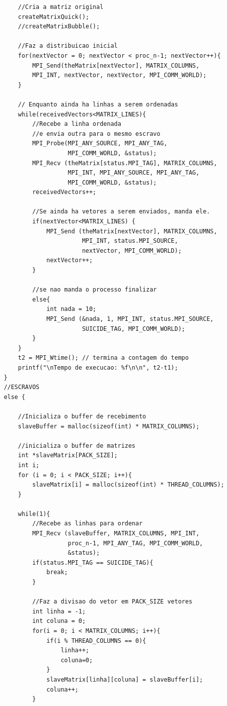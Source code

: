 \documentclass[12pt]{article}
\begin{document}
\begin{lstlisting}
        //Cria a matriz original
        createMatrixQuick();
        //createMatrixBubble();

        //Faz a distribuicao inicial
        for(nextVector = 0; nextVector < proc_n-1; nextVector++){
            MPI_Send(theMatrix[nextVector], MATRIX_COLUMNS,
            MPI_INT, nextVector, nextVector, MPI_COMM_WORLD);
        }

        // Enquanto ainda ha linhas a serem ordenadas
        while(receivedVectors<MATRIX_LINES){
            //Recebe a linha ordenada
            //e envia outra para o mesmo escravo
            MPI_Probe(MPI_ANY_SOURCE, MPI_ANY_TAG, 
                      MPI_COMM_WORLD, &status);
            MPI_Recv (theMatrix[status.MPI_TAG], MATRIX_COLUMNS,
                      MPI_INT, MPI_ANY_SOURCE, MPI_ANY_TAG,
                      MPI_COMM_WORLD, &status);
            receivedVectors++;

            //Se ainda ha vetores a serem enviados, manda ele.
            if(nextVector<MATRIX_LINES) {
                MPI_Send (theMatrix[nextVector], MATRIX_COLUMNS,
                          MPI_INT, status.MPI_SOURCE,
                          nextVector, MPI_COMM_WORLD);
                nextVector++;
            }
        
            //se nao manda o processo finalizar
            else{
                int nada = 10;
                MPI_Send (&nada, 1, MPI_INT, status.MPI_SOURCE,
                          SUICIDE_TAG, MPI_COMM_WORLD);
            }
        }
	    t2 = MPI_Wtime(); // termina a contagem do tempo
	    printf("\nTempo de execucao: %f\n\n", t2-t1);
    }
    //ESCRAVOS
    else {

        //Inicializa o buffer de recebimento
        slaveBuffer = malloc(sizeof(int) * MATRIX_COLUMNS);

        //inicializa o buffer de matrizes
        int *slaveMatrix[PACK_SIZE];
        int i;
        for (i = 0; i < PACK_SIZE; i++){
            slaveMatrix[i] = malloc(sizeof(int) * THREAD_COLUMNS);
        }

        while(1){
            //Recebe as linhas para ordenar
            MPI_Recv (slaveBuffer, MATRIX_COLUMNS, MPI_INT, 
                      proc_n-1, MPI_ANY_TAG, MPI_COMM_WORLD,
                      &status);
            if(status.MPI_TAG == SUICIDE_TAG){
                break;
            }

            //Faz a divisao do vetor em PACK_SIZE vetores
            int linha = -1;
            int coluna = 0;
            for(i = 0; i < MATRIX_COLUMNS; i++){
                if(i % THREAD_COLUMNS == 0){
                    linha++;
                    coluna=0;  
                } 
                slaveMatrix[linha][coluna] = slaveBuffer[i];
                coluna++;
            }


\end{lstlisting}
\end{document}
